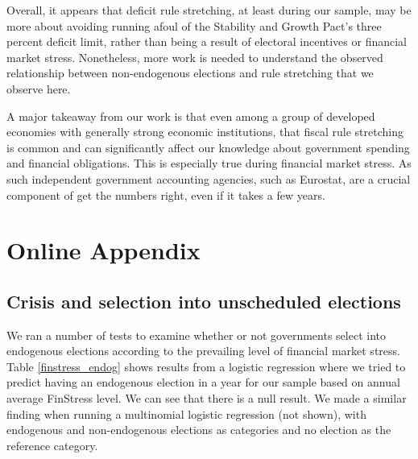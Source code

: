\documentclass[]{article}
\begin{document}
Overall, it appears that deficit rule stretching, at least during our sample, may be more about avoiding running afoul of the Stability and Growth Pact's three percent deficit limit, rather than being a result of electoral incentives or financial market stress. Nonetheless, more work is needed to understand the observed relationship between non-endogenous elections and rule stretching that we observe here.

A major takeaway from our work is that even among a group of developed economies with generally strong economic institutions, that fiscal rule stretching is common and can significantly affect our knowledge about government spending and financial obligations. This is especially true during financial market stress. As such independent government accounting agencies, such as Eurostat, are a crucial component of get the numbers right, even if it takes a few years.


\clearpage




\pagebreak
\renewcommand{\thepage}{A-\arabic{page}}\setcounter{page}{1}
\renewcommand{\thesection}{Appendix \arabic{section}}\setcounter{section}{0}
\renewcommand{\thetable}{A-\arabic{table}}\setcounter{table}{0}
\renewcommand{\thefigure}{A-\arabic{figure}}\setcounter{figure}{0}
\clearpage

\section*{Online Appendix}

\subsection*{Crisis and selection into unscheduled elections}

We ran a number of tests to examine whether or not governments select into endogenous elections according to the prevailing level of financial market stress. Table \ref{finstress_endog} shows results from a logistic regression where we tried to predict having an endogenous election in a year for our sample based on annual average FinStress level. We can see that there is a null result. We made a similar finding when running a multinomial logistic regression (not shown), with endogenous and non-endogenous elections as categories and no election as the reference category.


\end{document}
